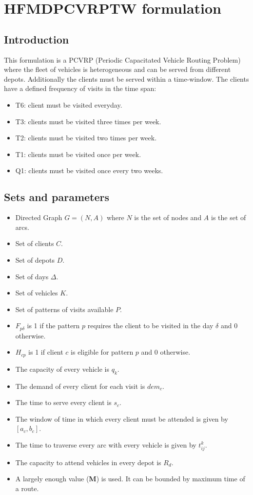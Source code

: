 \documentclass[preprint,review,12pt]{elsarticle}
\begin{document}
\section{HFMDPCVRPTW formulation}

\subsection{Introduction}
This formulation is a PCVRP (Periodic Capacitated Vehicle Routing Problem) where the fleet of vehicles is heterogeneous and can be served from different depots. Additionally the clients must be served within a time-window. The clients have a defined frequency of visits in the time span:

\begin{itemize}
	\item T6: client must be visited everyday.
	\item T3: clients must be visited three times per week.
	\item T2: clients must be visited two times per week.
	\item T1: clients must be visited once per week.
	\item Q1: clients must be visited once every two weeks.
\end{itemize}

\subsection{Sets and parameters}
\begin{itemize}
	\item Directed Graph $G = (N,A)$ where $N$ is the set of nodes and $A$ is the set of arcs.
	\item Set of clients $C$.
	\item Set of depots $D$.
	\item Set of days  $\Delta$.
	\item Set of vehicles $K$.
	\item Set of patterns of visits available $P$.
	\item $F_{p\delta}$ is 1 if the pattern $p$ requires the client to be visited in the day $\delta$ and 0 otherwise.
	\item $H_{cp}$ is 1 if client $c$ is eligible for pattern $p$ and 0 otherwise.
	\item The capacity of every vehicle is $q_k$.
	\item The demand of every client for each visit is $dem_c$.
	\item The time to serve every client is $s_c$.
	\item The window of time in which every client must be attended is given by $[a_c,b_c]$.
	\item The time to traverse every arc with every vehicle is given by $t_{ij}^k$.
	\item The capacity to attend vehicles in every depot is $R_d$.
	\item A largely enough value (\textbf{M}) is used. It can be bounded by maximum time of a route.
	
	
\end{itemize}
 
\end{document}
